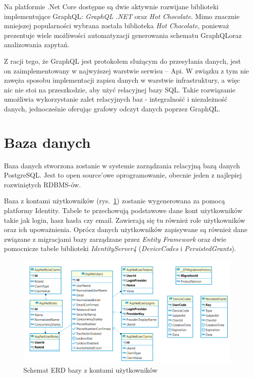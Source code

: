 	Na platformie \@.Net Core dostępne są dwie aktywnie rozwijane biblioteki implementujące GraphQL\@: \emph{GraphQL \@.NET} oraz \emph{Hot Chocolate}.
	Mimo znacznie mniejszej popularności wybrana została biblioteka \emph{Hot Chocolate},
	ponieważ prezentuje wiele możliwości automatyzacji generowania schematu GraphQL\@ oraz analizowania zapytań.

	Z racji tego, że GraphQL jest protokołem służącym do przesyłania danych, jest on zaimplementowany w najwyższej warstwie serwisu -- Api.
	W związku z tym nie zawęża sposobu implementacji zapisu danych w warstwie infrastruktury,
	a więc nic nie stoi na przeszkodzie, aby użyć relacyjnej bazy SQL.
	Takie rozwiązanie umożliwia wykorzystanie zalet relacyjnych baz - integralność i niezależność danych,
	jednocześnie oferując grafowy odczyt danych poprzez GraphQL.

\section{Baza danych}
	Baza danych stworzona zostanie w systemie zarządzania relacyjną bazą danych PostgreSQL.
	Jest to open source'owe oprogramowanie, obecnie jeden z najlepiej rozwiniętych RDBMS-ów.

	Baza z kontami użytkowników (rys.~\ref{fig:erdAuth}) zostanie wygenerowana za pomocą platformy Identity.
	Tabele te przechowują podstawowe dane kont użytkowników takie jak login, hasz hasła czy email.
	Zawierają się tu również role użytkowników oraz ich upoważnienia.
	Oprócz danych użytkowników zapisywane są również dane związane z migracjami bazy zarządzane przez \emph{Entity Framework}
	oraz dwie pomocnicze tabele biblioteki \emph{IdentityServer4} (\emph{DeviceCodes} i \emph{PersistedGrants}).

	\begin{figure}[ht]
		\centering
			\includegraphics[width=\linewidth]{rys03/erdAuth.png}
		 \caption{Schemat ERD bazy z kontami użytkowników}
		 \label{fig:erdAuth}
	\end{figure}
	
